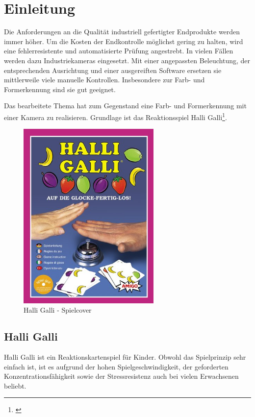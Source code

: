 
\section{Einleitung}
\label{sec:Einleitung}

Die Anforderungen an die Qualität industriell gefertigter Endprodukte werden immer höher. Um die Kosten der Endkontrolle möglichst gering zu halten, wird eine fehlerresistente und automatisierte Prüfung angestrebt. In vielen Fällen werden dazu Industriekameras eingesetzt. Mit einer angepassten Beleuchtung, der entsprechenden Ausrichtung und einer ausgereiften Software ersetzen sie mittlerweile viele manuelle Kontrollen. Insbesondere zur Farb- und Formerkennung sind sie gut geeignet.

Das bearbeitete Thema hat zum Gegenstand eine Farb- und Formerkennung mit einer Kamera zu realisieren. Grundlage ist das Reaktionsspiel Halli Galli\footnote{\cite{HalliGalli}}. 

\begin{figure}[H]
    \centering
    \includegraphics[width=7cm]{Abbildungen/cover}
    \caption[Cocer]{Halli Galli - Spielcover}
    \label{fig:Cover}
\end{figure}

\subsection{Halli Galli}

Halli Galli ist ein Reaktionskartenspiel für Kinder. Obwohl das Spielprinzip sehr einfach ist, ist es aufgrund der hohen Spielgeschwindigkeit, der geforderten Konzentrationsfähigkeit sowie der Stressresistenz auch bei vielen Erwachsenen beliebt. 

